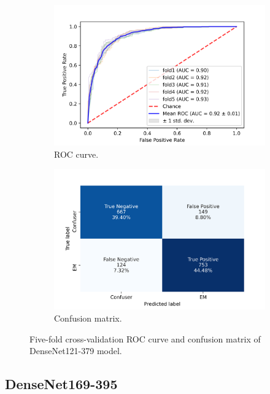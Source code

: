 \begin{figure}[h!]
	\centering
	\begin{subfigure}[b]{0.49\textwidth}
		\centering
		\includegraphics[width=\textwidth,keepaspectratio]{images/Supplement4/image123.png}
		\caption{ROC curve.}
	\end{subfigure}
	\hfill
	\begin{subfigure}[b]{0.49\textwidth}
		\centering
		\includegraphics[width=\textwidth,keepaspectratio]{images/Supplement4/image129.png}
		\caption{Confusion matrix.}
	\end{subfigure}
	\caption{Five-fold cross-validation ROC curve and confusion matrix of DenseNet121-379 model.}
\end{figure}

\vfill\clearpage
\subsection{DenseNet169-395}

